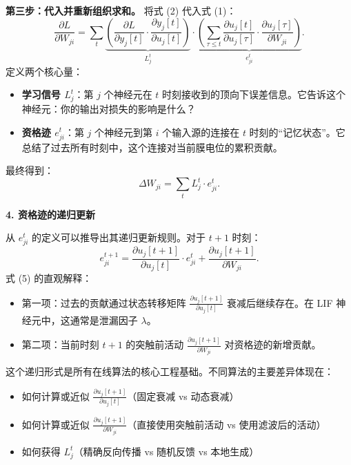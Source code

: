 \documentclass[journal,12pt,onecolumn]{IEEEtran}
\begin{document}
\textbf{第三步：代入并重新组织求和。}
将式 (2) 代入式 (1)：
\[
\frac{\partial L}{\partial W_{ji}} = \sum_t \underbrace{\left( \frac{\partial L}{\partial y_j[t]} \cdot \frac{\partial y_j[t]}{\partial u_j[t]} \right)}_{L_j^t} \cdot \underbrace{\left( \sum_{\tau \le t} \frac{\partial u_j[t]}{\partial u_j[\tau]} \cdot \frac{\partial u_j[\tau]}{\partial W_{ji}} \right)}_{e_{ji}^t}. \tag{3}
\]
定义两个核心量：
\begin{itemize}
    \item \textbf{学习信号 $L_j^t$}：第 $j$ 个神经元在 $t$ 时刻接收到的顶向下误差信息。它告诉这个神经元：你的输出对损失的影响是什么？
    \item \textbf{资格迹 $e_{ji}^t$}：第 $j$ 个神经元到第 $i$ 个输入源的连接在 $t$ 时刻的“记忆状态”。它总结了过去所有时刻中，这个连接对当前膜电位的累积贡献。
\end{itemize}

最终得到：
\[
\boxed{\Delta W_{ji} = \sum_t L_j^t \cdot e_{ji}^t}. \tag{4}
\]

\medskip\noindent\textbf{4. 资格迹的递归更新}

从 $e_{ji}^t$ 的定义可以推导出其递归更新规则。对于 $t+1$ 时刻：
\[
e_{ji}^{t+1} = \frac{\partial u_j[t+1]}{\partial u_j[t]} \cdot e_{ji}^t + \frac{\partial u_j[t+1]}{\partial W_{ji}}. \tag{5}
\]
式 (5) 的直观解释：
\begin{itemize}
    \item 第一项：过去的贡献通过状态转移矩阵 $\frac{\partial u_j[t+1]}{\partial u_j[t]}$ 衰减后继续存在。在 LIF 神经元中，这通常是泄漏因子 $\lambda$。
    \item 第二项：当前时刻 $t+1$ 的突触前活动 $\frac{\partial u_j[t+1]}{\partial W_{ji}}$ 对资格迹的新增贡献。
\end{itemize}

这个递归形式是所有在线算法的核心工程基础。不同算法的主要差异体现在：
\begin{itemize}
    \item 如何计算或近似 $\frac{\partial u_j[t+1]}{\partial u_j[t]}$（固定衰减 vs 动态衰减）
    \item 如何计算或近似 $\frac{\partial u_j[t+1]}{\partial W_{ji}}$（直接使用突触前活动 vs 使用滤波后的活动）
    \item 如何获得 $L_j^t$（精确反向传播 vs 随机反馈 vs 本地生成）
\end{itemize}


\end{document}
